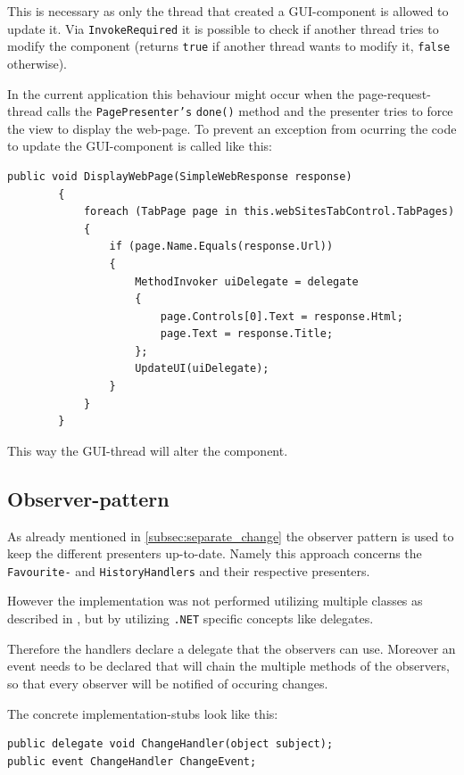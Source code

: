 This is necessary as only the thread that created a \ac{GUI}-component is allowed to update it.
Via \texttt{InvokeRequired} it is possible to check if another thread tries to modify the component (returns \texttt{true} if another thread wants to modify it, \texttt{false} otherwise).

In the current application this behaviour might occur when the page-request-thread calls the \texttt{PagePresenter's} \texttt{done()} method and the presenter tries to force the view to display the web-page.
To prevent an exception from ocurring the code to update the \ac{GUI}-component is called like this:

\begin{lstlisting}[caption=Displaying the web-page from the \ac{GUI}-thread.]
public void DisplayWebPage(SimpleWebResponse response)
        {
            foreach (TabPage page in this.webSitesTabControl.TabPages)
            {
                if (page.Name.Equals(response.Url))
                {
                    MethodInvoker uiDelegate = delegate
                    {
                        page.Controls[0].Text = response.Html;
                        page.Text = response.Title;
                    };
                    UpdateUI(uiDelegate);
                }
            }
        }
\end{lstlisting}

This way the \ac{GUI}-thread will alter the component.

\subsection{Observer-pattern}

As already mentioned in \autoref{subsec:separate_change} the observer pattern is used to keep the different presenters up-to-date.
Namely this approach concerns the \texttt{Favourite-} and \texttt{HistoryHandlers} and their respective presenters.

However the implementation was not performed utilizing multiple classes as described in \textcite{gamma1994}, but by utilizing \texttt{.NET} specific concepts like delegates.

Therefore the handlers declare a delegate that the observers can use.
Moreover an event needs to be declared that will chain the multiple methods of the observers, so that every observer will be notified of occuring changes.

The concrete implementation-stubs look like this:

\begin{lstlisting}[caption=Declaration of delegate and event.]
public delegate void ChangeHandler(object subject);
public event ChangeHandler ChangeEvent;
\end{lstlisting}

